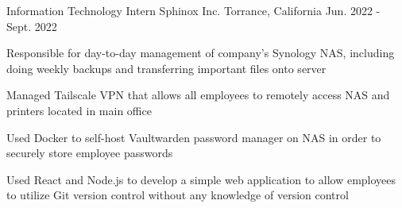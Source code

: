 \begin{cventries}
  \cventry
    {Information Technology Intern} %
    {Sphinox Inc.} %
    {Torrance, California} %
    {Jun. 2022 - Sept. 2022} %
    {
      \begin{cvitems} %
        \item{Responsible for day-to-day management of company’s Synology NAS, including doing weekly
              backups and transferring important files onto server}
        \item{Managed Tailscale VPN that allows all employees to remotely access NAS and printers located in
              main office}
        \item{Used Docker to self-host Vaultwarden password manager on NAS in order to securely store
              employee passwords}
        \item{Used React and Node.js to develop a simple web application to allow employees to utilize Git
              version control without any knowledge of version control}
      \end{cvitems}
  }
\end{cventries}
